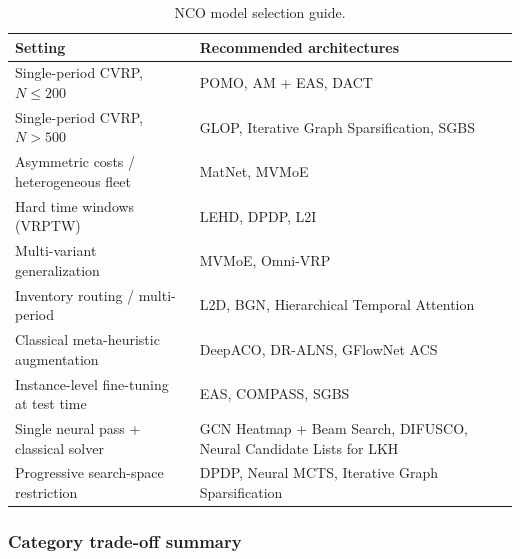 \documentclass{article}
\begin{document}
\begin{table}[H]
    \centering
    \caption{NCO model selection guide.}
    \begin{tabularx}{\textwidth}{@{} l X @{}}
        \toprule
        \textbf{Setting} & \textbf{Recommended architectures} \\
        \midrule
        Single-period CVRP, $N \leq 200$ & POMO, AM + EAS, DACT \\
        Single-period CVRP, $N > 500$ & GLOP, Iterative Graph Sparsification, SGBS \\
        Asymmetric costs / heterogeneous fleet & MatNet, MVMoE \\
        Hard time windows (VRPTW) & LEHD, DPDP, L2I \\
        Multi-variant generalization & MVMoE, Omni-VRP \\
        Inventory routing / multi-period & L2D, BGN, Hierarchical Temporal Attention \\
        Classical meta-heuristic augmentation & DeepACO, DR-ALNS, GFlowNet ACS \\
        Instance-level fine-tuning at test time & EAS, COMPASS, SGBS \\
        Single neural pass + classical solver & GCN Heatmap + Beam Search, DIFUSCO, Neural Candidate Lists for LKH \\
        Progressive search-space restriction & DPDP, Neural MCTS, Iterative Graph Sparsification \\
        \bottomrule
    \end{tabularx}
\end{table}

\subsubsection*{Category trade-off summary}
\end{document}
